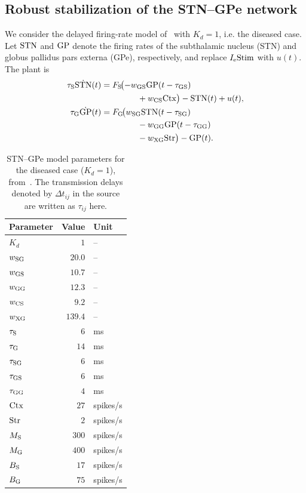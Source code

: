 \subsection{Robust stabilization of the STN--GPe network}
We consider the delayed firing-rate model
of~\cite[Eq.~(5)]{nevadoHolgado2010betaOscillations} with $K_d =1$, i.e. the diseased case.
Let ${\mathrm{STN}}$ and
${\mathrm{GP}}$ denote the firing rates of the subthalamic nucleus (STN) and
globus pallidus pars externa (GPe), respectively, and replace $I_{{\mathrm{e}}}{\mathrm{Stim}}$
with $ u(t)$. The plant is
\begin{equation}
      \begin{aligned}
      \tau_{{\mathrm{S}}} \dot{{\mathrm{STN}}}(t)
          ={}&F_{{\mathrm{S}}}\!\bigl(-w_{{\mathrm{GS}}}{\mathrm{GP}}
              (t-\tau_{{\mathrm{GS}}})\\
             &\qquad\quad +w_{{\mathrm{CS}}}{\mathrm{Ctx}}\bigr)
              -{\mathrm{STN}}(t)+ u(t),\\
      \tau_{{\mathrm{G}}} \dot{{\mathrm{GP}}}(t)
          ={}&F_{{\mathrm{G}}}\!\bigl(w_{{\mathrm{SG}}}{\mathrm{STN}}
              (t-\tau_{{\mathrm{SG}}})\\
             &\qquad\quad-w_{{\mathrm{GG}}}{\mathrm{GP}}(t-\tau_{{\mathrm{GG}}})\\
             &\qquad\quad-w_{{\mathrm{XG}}}{\mathrm{Str}}\bigr)-{\mathrm{GP}}(t).
      \end{aligned}
\end{equation}
\begin{table}[H]
 \centering
 \caption{STN--GPe model parameters for the diseased case ($K_d=1$),
 from~\cite[Tables~1 and~3]{nevadoHolgado2010betaOscillations}.
 The transmission delays denoted by $\Delta t_{ij}$ in the source
 are written as $\tau_{ij}$ here.}
 \label{tab:stn-gpe-diseased-parameters}
 \small
 \begin{tabular}{@{}lrl@{}}
  \toprule
  Parameter & Value & Unit \\
  \midrule
  $K_d$ & $1$ & -- \\
  \midrule
  $w_{{\mathrm{SG}}}$ & $20.0$ & -- \\
  $w_{{\mathrm{GS}}}$ & $10.7$ & -- \\
  $w_{{\mathrm{GG}}}$ & $12.3$ & -- \\
  $w_{{\mathrm{CS}}}$ & $9.2$ & -- \\
  $w_{{\mathrm{XG}}}$ & $139.4$ & -- \\
  \midrule
  $\tau_{{\mathrm{S}}}$ & $6$ & ms \\
  $\tau_{{\mathrm{G}}}$ & $14$ & ms \\
  $\tau_{{\mathrm{SG}}}$ & $6$ & ms \\
  $\tau_{{\mathrm{GS}}}$ & $6$ & ms \\
  $\tau_{{\mathrm{GG}}}$ & $4$ & ms \\
  \midrule
  ${\mathrm{Ctx}}$ & $27$ & spikes/s \\
  ${\mathrm{Str}}$ & $2$ & spikes/s \\
  $M_{{\mathrm{S}}}$ & $300$ & spikes/s \\
  $M_{{\mathrm{G}}}$ & $400$ & spikes/s \\
  $B_{{\mathrm{S}}}$ & $17$ & spikes/s \\
  $B_{{\mathrm{G}}}$ & $75$ & spikes/s \\
  \bottomrule
 \end{tabular}
\end{table}

